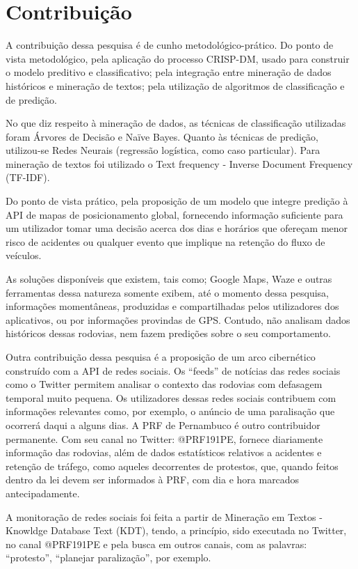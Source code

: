\chapter{Contribuição}\label{meto}

A contribuição dessa pesquisa é de cunho metodológico-prático.
Do ponto de vista metodológico, pela aplicação do processo CRISP-DM, usado para construir o modelo preditivo e classificativo; pela integração entre mineração de dados históricos e mineração de textos; pela utilização de algoritmos de classificação e de predição. 

No que diz respeito à mineração de dados, as técnicas de classificação utilizadas foram Árvores de Decisão e Naïve Bayes. Quanto às técnicas de predição, utilizou-se Redes Neurais (regressão logística, como caso particular). Para mineração de textos foi utilizado o Text frequency - Inverse Document Frequency (TF-IDF).

Do ponto de vista prático, pela proposição de um modelo que integre predição à API de mapas de posicionamento global, fornecendo informação suficiente para um utilizador tomar uma decisão acerca dos dias e horários que ofereçam menor risco de acidentes ou qualquer evento que implique na retenção do fluxo de veículos. 

As soluções disponíveis que existem, tais como; Google Maps, Waze e outras ferramentas dessa natureza somente exibem, até o momento dessa pesquisa, informações momentâneas, produzidas e compartilhadas pelos utilizadores dos aplicativos, ou por informações provindas de GPS. Contudo, não analisam dados históricos dessas rodovias, nem fazem predições sobre o seu comportamento.

Outra contribuição dessa pesquisa é a proposição de um arco cibernético construído com a API de redes sociais.
Os ``feeds'' de notícias das redes sociais como o Twitter permitem analisar o contexto das rodovias com defasagem temporal muito pequena.
Os utilizadores dessas redes sociais contribuem com informações relevantes como, por exemplo, o anúncio de uma paralisação que ocorrerá 
daqui a alguns dias. A PRF de Pernambuco é outro contribuidor permanente. Com seu canal no Twitter: @PRF191PE, fornece diariamente informação das rodovias, 
além de dados estatísticos relativos a acidentes e retenção de tráfego, como aqueles decorrentes de protestos, que, quando feitos dentro da lei
devem ser informados à PRF, com dia e hora marcados antecipadamente.

A monitoração de redes sociais foi feita a partir de Mineração em Textos - Knowldge Database Text (KDT), tendo, a princípio, sido executada no Twitter, no canal @PRF191PE e pela busca em outros canais, com as palavras: ``protesto'', ``planejar paralização'', por exemplo. 

